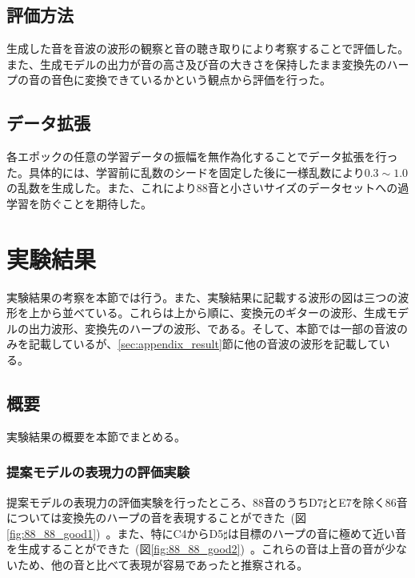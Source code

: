 \clearpage

\subsection{評価方法}

生成した音を音波の波形の観察と音の聴き取りにより考察することで評価した。また、生成モデルの出力が音の高さ及び音の大きさを保持したまま変換先のハープの音の音色に変換できているかという観点から評価を行った。

\subsection{データ拡張}

各エポックの任意の学習データの振幅を無作為化することでデータ拡張を行った。具体的には、学習前に乱数のシードを固定した後に一様乱数により$0.3\sim1.0$の乱数を生成した。また、これにより88音と小さいサイズのデータセットへの過学習を防ぐことを期待した。

\clearpage

\section{実験結果}
\label{result}

実験結果の考察を本節では行う。また、実験結果に記載する波形の図は三つの波形を上から並べている。これらは上から順に、変換元のギターの波形、生成モデルの出力波形、変換先のハープの波形、である。そして、本節では一部の音波のみを記載しているが、\ref{sec:appendix_result}節に他の音波の波形を記載している。

\subsection{概要}

実験結果の概要を本節でまとめる。

\subsubsection{提案モデルの表現力の評価実験}

提案モデルの表現力の評価実験を行ったところ、88音のうちD7$\sharp$とE7を除く86音については変換先のハープの音を表現することができた~(図\ref{fig:88_88_good1})~。また、特にC4からD5$\sharp$は目標のハープの音に極めて近い音を生成することができた~(図\ref{fig:88_88_good2})~。これらの音は上音の音が少ないため、他の音と比べて表現が容易であったと推察される。

